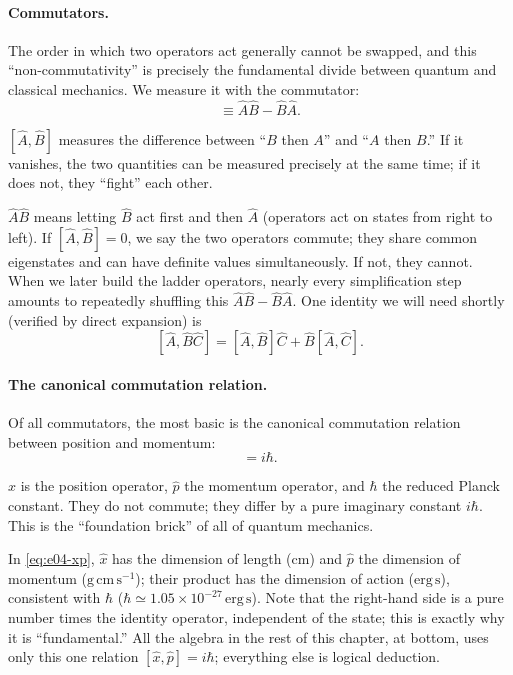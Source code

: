 \paragraph{Commutators.}
The order in which two operators act generally cannot be swapped, and this ``non-commutativity'' is precisely the fundamental divide between quantum and classical mechanics. We measure it with the commutator:
\begin{equation}
  [\hat A,\hat B]\equiv \hat A\hat B-\hat B\hat A .
  \label{eq:e04-commutator}
\end{equation}
\begin{formulaexplain}
\([\hat A,\hat B]\) measures the difference between ``\(B\) then \(A\)'' and ``\(A\) then \(B\).'' If it vanishes, the two quantities can be measured precisely at the same time; if it does not, they ``fight'' each other.
\end{formulaexplain}
\(\hat A\hat B\) means letting \(\hat B\) act first and then \(\hat A\) (operators act on states from right to left). If \([\hat A,\hat B]=0\), we say the two operators commute; they share common eigenstates and can have definite values simultaneously. If not, they cannot. When we later build the ladder operators, nearly every simplification step amounts to repeatedly shuffling this \(\hat A\hat B-\hat B\hat A\). One identity we will need shortly (verified by direct expansion) is
\[
  [\hat A,\hat B\hat C]=[\hat A,\hat B]\hat C+\hat B[\hat A,\hat C].
\]

\paragraph{The canonical commutation relation.}
Of all commutators, the most basic is the canonical commutation relation between position and momentum:
\begin{equation}
  [\hat x,\hat p]=i\hbar .
  \label{eq:e04-xp}
\end{equation}
\begin{formulaexplain}
\(\hat x\) is the position operator, \(\hat p\) the momentum operator, and \(\hbar\) the reduced Planck constant. They do not commute; they differ by a pure imaginary constant \(i\hbar\). This is the ``foundation brick'' of all of quantum mechanics.
\end{formulaexplain}
In \eqref{eq:e04-xp}, \(\hat x\) has the dimension of length (cm) and \(\hat p\) the dimension of momentum (\(\mathrm{g\,cm\,s^{-1}}\)); their product has the dimension of action (\(\mathrm{erg\,s}\)), consistent with \(\hbar\) (\(\hbar\simeq1.05\times10^{-27}\,\mathrm{erg\,s}\)). Note that the right-hand side is a pure number times the identity operator, independent of the state; this is exactly why it is ``fundamental.'' All the algebra in the rest of this chapter, at bottom, uses only this one relation \([\hat x,\hat p]=i\hbar\); everything else is logical deduction.


